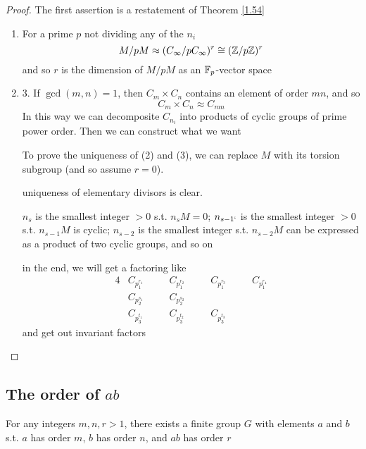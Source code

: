 \documentclass[11pt]{article}
\begin{document}
\begin{proof}
The first assertion is a restatement of Theorem \ref{1.54}
\begin{enumerate}
\item For a prime \(p\) not dividing any of the \(n_i\)
\begin{equation*}
M/pM\approx(C_\infty/pC_\infty)^r\cong(\mathbb{Z}/p\mathbb{Z})^r
\end{equation*}
and so \(r\) is the dimension of \(M/pM\) as an \(\mathbb{F}_p\)-vector space
\item 3. If \(\gcd(m,n)=1\), then \(C_m\times C_n\) contains an element of order \(mn\), and so
\begin{equation*}
C_m\times C_n\approx C_{mn}
\end{equation*}
In this way we can decomposite \(C_{n_i}\) into products of cyclic groups of prime power order.
Then we can construct what we want

To prove the uniqueness of (2) and (3), we can replace \(M\) with its torsion subgroup (and
so assume \(r=0\)).

uniqueness of elementary divisors is clear.

\(n_s\) is the smallest integer \(>0\) s.t. \(n_sM=0\); \(n_{s-1`}\) is the smallest
integer \(>0\) s.t. \(n_{s-1}M\) is cyclic; \(n_{s-2}\) is the smallest integer
s.t. \(n_{s-2}M\) can be expressed as a product of two cyclic groups, and so on

in the end, we will get a factoring like
\begin{alignat*}{4}
&C_{p_1^{r_1}}\quad&&C_{p_1^{r_2}}\quad&&C_{p_1^{r_3}}\quad&&C_{p_1^{r_4}}\\
&C_{p_2^{s_1}}&&C_{p_2^{s_2}}\\
&C_{p_3^{t_1}}&&C_{p_3^{t_2}}&&C_{p_3^{t_3}}
\end{alignat*}
and get out invariant factors
\end{enumerate}
\end{proof}
\subsection{The order of \texorpdfstring{\(ab\)}{ab}}
\label{sec:orgb09201c}
\begin{theorem}[]
For any integers \(m,n,r>1\), there exists a finite group \(G\) with elements \(a\) and \(b\)
s.t. \(a\) has order \(m\), \(b\) has order \(n\), and \(ab\) has order \(r\)
\end{theorem}
\end{document}
